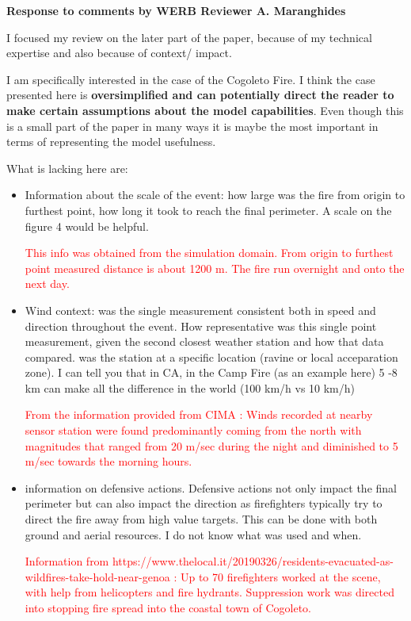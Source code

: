 \documentclass[12pt]{article}
\newcommand\hl[1]{\textcolor{red}{#1}}
\begin{document}
\begin{center}
{\bf Response to comments by WERB Reviewer A. Maranghides}
\end{center}

I focused my review on the later part of the paper, because of my technical expertise and also because of context/ impact.

I am specifically interested in the case of the Cogoleto Fire. I think the case presented here is \textbf{oversimplified and can potentially direct the reader to make certain assumptions about the model capabilities}. Even though this is a small part of the paper in many ways it is maybe the most important in terms of representing the model usefulness.

What is lacking here are:
%
\begin{itemize}
   
   \item Information about the scale of the event: how large was the fire from origin to furthest point, how long it took to reach the final perimeter. A scale on the figure 4 would be helpful. 
   
   \hl{This info was obtained from the simulation domain. From origin to furthest point measured distance is about 1200 m. The fire run overnight and onto the next day.} 
   
   \item Wind context: was the single measurement consistent both in speed and direction throughout the event. How representative was this single point measurement, given the second closest weather station and how that data compared. was the station at a specific location (ravine or local acceparation zone). I can tell you that in CA, in the Camp Fire (as an example here) 5 -8 km can make all the difference in the world (100 km/h vs 10 km/h)
   
   \hl{From the information provided from CIMA : Winds recorded at nearby sensor station were found predominantly coming from the north with magnitudes that ranged from 20 m/sec during the night and diminished to 5 m/sec towards the morning hours.}
   
   \item information on defensive actions. Defensive actions not only impact the final perimeter but can also impact the direction as firefighters typically try to direct the fire away from high value targets. This can be done with both ground and aerial resources. I do not know what was used and when.

   \hl{Information from https://www.thelocal.it/20190326/residents-evacuated-as-wildfires-take-hold-near-genoa : Up to 70 firefighters worked at the scene, with help from helicopters and fire hydrants. Suppression work was directed into stopping fire spread into the coastal town of Cogoleto.}


\end{itemize}
\end{document}
